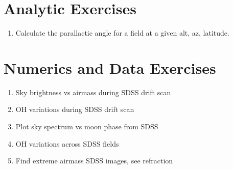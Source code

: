 \section{Analytic Exercises}

\begin{enumerate}
\item Calculate the parallactic angle for a field at a given alt, az,
    latitude.
\end{enumerate}

\section{Numerics and Data Exercises}

\begin{enumerate}
\item Sky brightness vs airmass during SDSS drift scan
\item OH variations during SDSS drift scan
\item Plot sky spectrum vs moon phase from SDSS
\item OH variations across SDSS fields
\item Find extreme airmass SDSS images, see refraction
\end{enumerate}


  
